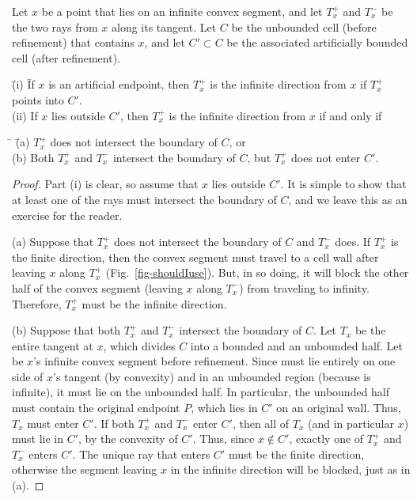 \begin{lemma}
\label{lem-ty}
Let $x$ be a point that lies on an infinite convex segment,
and let $T_{x}^{+}$ and $T_{x}^{-}$ be the two rays from $x$ along its tangent.
Let $C$ be the unbounded cell {\rm (}before refinement{\rm )} that contains $x$, and 
let $C' \subset C$ be the associated artificially bounded cell 
{\rm (}after refinement{\rm )}.
%
\begin{tabbing}
\indent \= {\rm (i)} \= If $x$ is an artificial endpoint,
then $T_{x}^{+}$ is the infinite direction from $x$ if 
$T_{x}^{+}$ \\
\> \> points into $C'$.\\
\> {\rm (ii)} If $x$ lies outside $C'$, then 
$T_{x}^{+}$ is the infinite direction from $x$ if and only if
\end{tabbing}
\begin{tabbing}
\indent \= \hspace{.15in} \= {\rm (a)} $T_{x}^{+}$ does not 
intersect the boundary of $C$, or\\
\> \> {\rm (b)} Both $T_{x}^{+}$ and $T_{x}^{-}$ intersect the boundary of $C$, 
	but $T_{x}^{+}$ does not enter $C'$.
\end{tabbing}
\end{lemma}
\begin{proof}
Part (i) is clear, so assume that $x$ lies outside $C'$.
It is simple to show that at least one of the rays must intersect the boundary
of $C$, and we leave this as an exercise for the reader.

(a) Suppose that $T_{x}^{+}$ does not intersect the boundary of $C$ and $T_{x}^{-}$ does.
If $T_{x}^{+}$ is the finite direction,
then the convex segment must travel to a cell wall after leaving $x$ along $T_{x}^{+}$
(Fig.~\ref{fig-shouldIuse}).
But, in so doing, it will block the other half of the convex segment 
(leaving $x$ along $T_{x}^{-}$) from traveling to infinity.
Therefore, $T_{x}^{+}$ must be the infinite direction.

(b) Suppose that both $T_{x}^{+}$ and $T_{x}^{-}$ intersect the boundary of $C$.
Let $T_{x}$ be the entire tangent at $x$, which 
divides $C$ into a bounded and an unbounded half.
Let  be $x$'s infinite convex segment before refinement.
Since  must lie entirely on one side of $x$'s tangent (by convexity)
and in an unbounded region (because  is infinite), it must lie
on the unbounded half.
In particular, the unbounded half must contain the original endpoint $P$, which
lies in $C'$ on an original wall.
Thus, $T_{x}$ must enter $C'$.
If both $T_{x}^{+}$ and $T_{x}^{-}$ enter $C'$, then 
all of $T_{x}$ (and in particular $x$) must lie in $C'$, by the
convexity of $C'$.
Thus, since $x \not\in C'$, exactly one of $T_{x}^{+}$ and $T_{x}^{-}$
enters $C'$.
The unique ray that enters $C'$ must be the finite direction, otherwise 
the segment leaving $x$ in the infinite direction will be blocked, just as in (a).
\end{proof}

